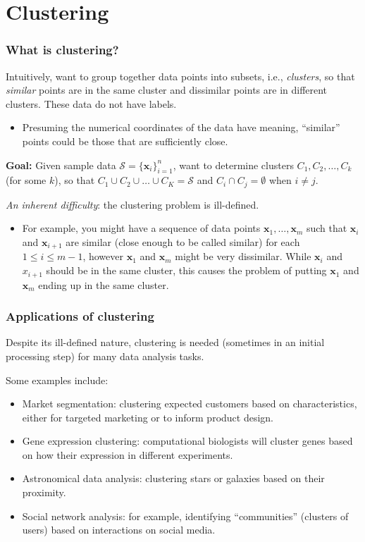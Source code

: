 \documentclass[smaller]{beamer}
\theoremstyle{example}
\newcommand{\x}{\textbf{x}}
\begin{document}
\section{Clustering}

\begin{frame}
    \frametitle{What is clustering?}
    Intuitively, want to group together data points into subsets, i.e., \textit{clusters}, so that \textit{similar} points are in the same cluster and dissimilar points are in different clusters. These data do not have labels. 
    
    \begin{itemize}
        \item Presuming the numerical coordinates of the data have meaning, ``similar'' points could be those that are sufficiently close.
    \end{itemize}
    
    \textbf{Goal:} Given sample data $\mathcal S=\{\x_i\}_{i=1}^n$, want to determine clusters $C_1,C_2,\ldots,C_k$ (for some $k$), so that $C_1\cup C_2\cup \ldots\cup C_K= \mathcal S$ and $C_i\cap C_j = \emptyset$ when $i\ne j$.
    \vfill 

    \textit{An inherent difficulty}: the clustering problem is ill-defined. 
    \begin{itemize}
        \item For example, you might have a sequence of data points $\x_1,\ldots,\x_m$ such that $\x_i$ and $\x_{i+1}$ are similar (close enough to be called similar) for each $1\le i\le m-1$, however $\x_1$ and $\x_m$ might be very dissimilar. While $\x_i$ and $x_{i+1}$ should be in the same cluster, this causes the problem of putting $\x_1$ and $\x_m$ ending up in the same cluster.
    \end{itemize}
\end{frame}

\begin{frame}
    \frametitle{Applications of clustering}
    Despite its ill-defined nature, clustering is needed (sometimes in an initial processing step) for many data analysis tasks. 

    Some examples include:
    \begin{itemize}
        \item Market segmentation: clustering expected customers based on characteristics, either for targeted marketing or to inform product design.
        \item Gene expression clustering: computational biologists will cluster genes based on how their expression in different experiments.
        \item Astronomical data analysis: clustering stars or galaxies based on their proximity.
        \item Social network analysis: for example, identifying ``communities'' (clusters of users) based on interactions on social media.
    \end{itemize}
\end{frame}
\end{document}
